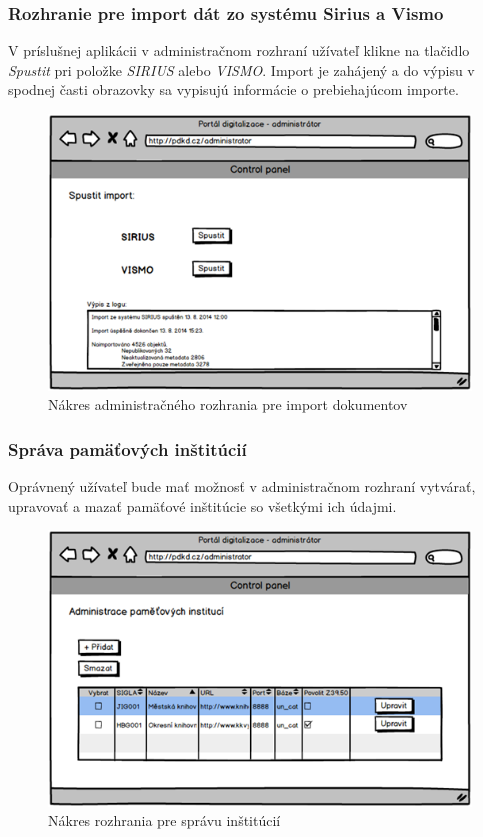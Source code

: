 \documentclass[
  print, %
  table,   %
  lof,     %
  nolot,     %
]{fithesis3}
\begin{document}
\subsubsection{Rozhranie pre import dát zo systému Sirius a Vismo}
V príslušnej aplikácii v administračnom rozhraní užívateľ klikne na tlačidlo \textit{Spustit} pri položke \textit{SIRIUS} alebo \textit{VISMO}. Import je zahájený a do výpisu v spodnej časti obrazovky sa vypisujú informácie o prebiehajúcom importe.
\clearpage
\begin{figure}[H]
	\centering
		\includegraphics[width=\textwidth]{fithesis/mockup/import.png}	
	\caption{Nákres administračného rozhrania pre import dokumentov}
	\label{mockup-import}
\end{figure}

\subsubsection{Správa pamäťových inštitúcií}
Oprávnený užívateľ bude mať možnosť v administračnom rozhraní vytvárať, upravovať a mazať pamäťové inštitúcie so všetkými ich údajmi.
\clearpage
\begin{figure}[H]
	\centering
		\includegraphics[width=\textwidth]{fithesis/mockup/institution.png}	
	\caption{Nákres rozhrania pre správu inštitúcií}
	\label{mockup-institution}
\end{figure}
\clearpage
\end{document}
